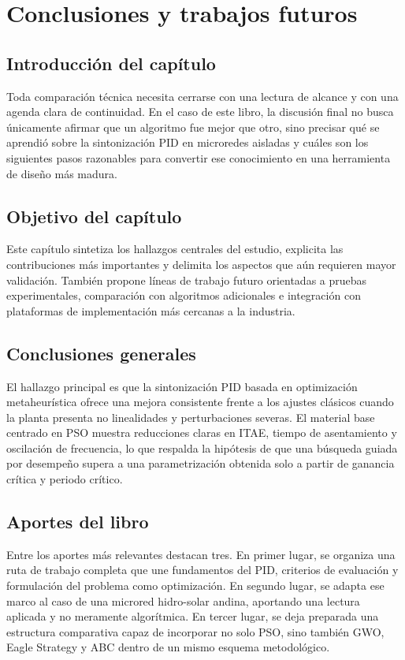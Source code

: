 \chapter{Conclusiones y trabajos futuros}
\label{ch:conclusiones}

\section{Introducción del capítulo}
Toda comparación técnica necesita cerrarse con una lectura de alcance y con una agenda clara
de continuidad. En el caso de este libro, la discusión final no busca únicamente afirmar que un
algoritmo fue mejor que otro, sino precisar qué se aprendió sobre la sintonización PID en
microredes aisladas y cuáles son los siguientes pasos razonables para convertir ese conocimiento
en una herramienta de diseño más madura.

\section{Objetivo del capítulo}
Este capítulo sintetiza los hallazgos centrales del estudio, explicita las contribuciones más
importantes y delimita los aspectos que aún requieren mayor validación. También propone
líneas de trabajo futuro orientadas a pruebas experimentales, comparación con algoritmos
adicionales e integración con plataformas de implementación más cercanas a la industria.

\section{Conclusiones generales}
El hallazgo principal es que la sintonización PID basada en optimización metaheurística ofrece
una mejora consistente frente a los ajustes clásicos cuando la planta presenta no linealidades y
perturbaciones severas. El material base centrado en PSO muestra reducciones claras en ITAE,
tiempo de asentamiento y oscilación de frecuencia, lo que respalda la hipótesis de que una
búsqueda guiada por desempeño supera a una parametrización obtenida solo a partir de
ganancia crítica y periodo crítico.

\section{Aportes del libro}
Entre los aportes más relevantes destacan tres. En primer lugar, se organiza una ruta de
trabajo completa que une fundamentos del PID, criterios de evaluación y formulación del
problema como optimización. En segundo lugar, se adapta ese marco al caso de una microred
hidro-solar andina, aportando una lectura aplicada y no meramente algorítmica. En tercer lugar,
se deja preparada una estructura comparativa capaz de incorporar no solo PSO, sino también
GWO, Eagle Strategy y ABC dentro de un mismo esquema metodológico.

